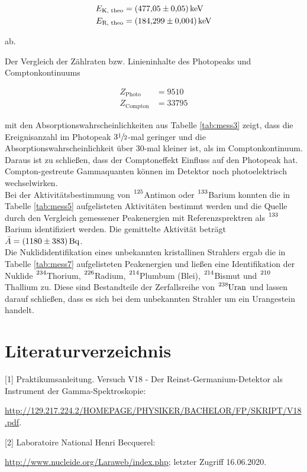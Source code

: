 \begin{align*}
    E_\text{K, theo} &= \SI{477.05 +- 0.05}{\kilo\eV} \\
    E_\text{R, theo} &= \SI{184.299 +- 0.004}{\kilo\eV}
\end{align*}

ab.

Der Vergleich der Zählraten bzw. Linieninhalte des Photopeaks und Comptonkontinuums

\begin{align*}
    Z_\text{Photo} &= \num{9510} \\
    Z_\text{Compton} &= \num{33795}
\end{align*}

mit den Absorptionswahrscheinlichkeiten aus Tabelle \ref{tab:mess3} zeigt, dass die Ereignisanzahl im Photopeak 
$3 \sfrac{1}{2}$-mal geringer und die Absorptionswahrscheinlichkeit über $30$-mal kleiner ist, als im Comptonkontinuum.
Daraus ist zu schließen, dass der Comptoneffekt Einfluss auf den Photopeak hat. Compton-gestreute Gammaquanten können im 
Detektor noch photoelektrisch wechselwirken.\\

Bei der Aktivitätsbestimmung von  $\ce{^{125}}$Antimon oder  $\ce{^{133}}$Barium konnten
die in Tabelle \ref{tab:mess5} aufgelisteten Aktivitäten bestimmt werden und die Quelle durch den
Vergleich gemessener Peakenergien mit Referenzsprektren als $\ce{^{133}}$Barium identifiziert werden.
Die gemittelte Aktivität beträgt $\bar{A} = \SI{1180 +- 383}{\becquerel}$.\\

Die Nuklididentifikation eines unbekannten kristallinen Strahlers ergab die in Tabelle \ref{tab:mess7}
aufgelisteten Peakenergien und ließen eine Identifikation der Nuklide 
$\ce{^{234}}$Thorium, $\ce{^{226}}$Radium, $\ce{^{214}}$Plumbum (Blei), $\ce{^{214}}$Bismut und
$\ce{^{210}}$Thallium zu. Diese sind Bestandteile der Zerfallsreihe von $\ce{^{238}Uran}$ und lassen
darauf schließen, dass es sich bei dem unbekannten Strahler um ein Urangestein handelt.


\section{Literaturverzeichnis}
\label{sec:Literaturverzeichnis}

[1] Praktikumsanleitung. Versuch V18 - Der Reinst-Germanium-Detektor als Instrument
der Gamma-Spektroskopie:

\url{http://129.217.224.2/HOMEPAGE/PHYSIKER/BACHELOR/FP/SKRIPT/V18.pdf}.

[2] Laboratoire National Henri Becquerel:

\url{http://www.nucleide.org/Laraweb/index.php}; letzter Zugriff 16.06.2020.
